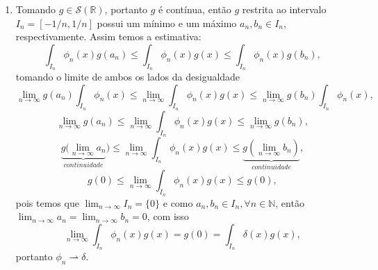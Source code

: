 \documentclass{article}
\begin{document}
\begin{enumerate}
\begin{enumerate}
				\item Tomando $g \in \mathcal{S}(\mathbb{R})$, portanto $g$ é contínua, então $g$ restrita ao intervalo $I_{n}= [-1/n, 1/n]$ possui um mínimo e um máximo $a_{n}, b_{n} \in I_{n}$, respectivamente. Assim temos a estimativa:
				$$
				\int_{I_{n}} \phi_{n}(x) g(a_{n}) \leq \int_{I_{n}}\phi_{n}(x)g(x) \leq \int_{I_{n}} \phi_{n}(x) g(b_{n}),
				$$
				tomando o limite de ambos os lados da desigualdade
				$$
				\lim_{n\to \infty} g(a_{n}) \int_{I_{n}} \phi_{n}(x) \leq \lim_{n\to \infty} \int_{I_{n}}\phi_{n}(x)g(x) \leq  \lim_{n\to \infty}  g(b_{n}) \int_{I_{n}} \phi_{n}(x),
				$$
				$$
				\lim_{n\to \infty} g(a_{n}) \leq \lim_{n\to \infty} \int_{I_{n}}\phi_{n}(x)g(x) \leq  \lim_{n\to \infty}  g(b_{n}) ,
				$$
				$$
				\underbrace{ g(\lim_{n\to \infty} a_{n}}_{continuidade}) \leq \lim_{n\to \infty} \int_{I_{n}}\phi_{n}(x)g(x) \leq \underbrace{ g(\lim_{n\to \infty} b_{n}) }_{continuidade} ,
				$$
				$$
				g(0) \leq \lim_{n\to \infty} \int_{I_{n}}\phi_{n}(x)g(x) \leq  g(0) ,
				$$
				pois temos que $\lim_{n \to \infty} I_{n} = \{0\}$ e como $a_{n}, b_{n} \in I_{n}, \forall n \in \mathbb{N}$, então $\lim_{n \to \infty} a_{n} = \lim_{n \to \infty} b_{n} = 0$, com isso
				$$
				 \lim_{n\to \infty} \int_{I_{n}}\phi_{n}(x)g(x) = g(0) = \int_{I_{n}}\delta(x)g(x),
				$$
				portanto $\phi_{n} \rightharpoonup \delta$.
				 
			\end{enumerate}
	\end{enumerate}
	
	
\end{document}
